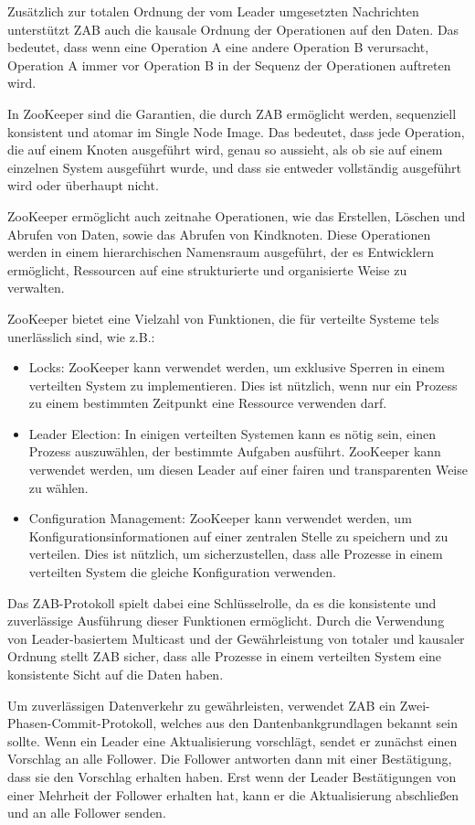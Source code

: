 Zusätzlich zur totalen Ordnung der vom Leader umgesetzten Nachrichten  unterstützt ZAB auch die kausale Ordnung der Operationen auf den Daten. Das bedeutet, dass wenn eine Operation A eine andere Operation B verursacht, Operation A immer vor Operation B in der Sequenz der Operationen auftreten wird.

In ZooKeeper sind die Garantien, die durch ZAB ermöglicht werden, sequenziell konsistent und atomar im Single Node Image. Das bedeutet, dass jede Operation, die auf einem Knoten ausgeführt wird, genau so aussieht, als ob sie auf einem einzelnen System ausgeführt wurde, und dass sie entweder vollständig ausgeführt wird oder überhaupt nicht.

ZooKeeper ermöglicht auch zeitnahe Operationen, wie das Erstellen, Löschen und Abrufen von Daten, sowie das Abrufen von Kindknoten. Diese Operationen werden in einem hierarchischen Namensraum ausgeführt, der es Entwicklern ermöglicht, Ressourcen auf eine strukturierte und organisierte Weise zu verwalten.

ZooKeeper bietet eine Vielzahl von Funktionen, die für verteilte Systeme tels unerlässlich sind, wie z.B.:
\begin{itemize}
\item Locks: ZooKeeper kann verwendet werden, um exklusive Sperren in einem verteilten System zu implementieren. Dies ist nützlich, wenn nur ein Prozess zu einem bestimmten Zeitpunkt eine Ressource verwenden darf.
\item Leader Election: In einigen verteilten Systemen kann es nötig sein, einen Prozess auszuwählen, der bestimmte Aufgaben ausführt. ZooKeeper kann verwendet werden, um diesen Leader auf einer fairen und transparenten Weise zu wählen.
\item Configuration Management: ZooKeeper kann verwendet werden, um Konfigurationsinformationen auf einer zentralen Stelle zu speichern und zu verteilen. Dies ist nützlich, um sicherzustellen, dass alle Prozesse in einem verteilten System die gleiche Konfiguration verwenden.
\end{itemize}

Das ZAB-Protokoll spielt dabei eine Schlüsselrolle, da es die konsistente und zuverlässige Ausführung dieser Funktionen ermöglicht. Durch die Verwendung von Leader-basiertem Multicast und der Gewährleistung von totaler und kausaler Ordnung stellt ZAB sicher, dass alle Prozesse in einem verteilten System eine konsistente Sicht auf die Daten haben.

Um zuverlässigen Datenverkehr zu gewährleisten, verwendet ZAB ein Zwei-Phasen-Commit-Protokoll, welches aus den Dantenbankgrundlagen bekannt sein sollte. Wenn ein Leader eine Aktualisierung vorschlägt, sendet er zunächst einen Vorschlag an alle Follower. Die Follower antworten dann mit einer Bestätigung, dass sie den Vorschlag erhalten haben. Erst wenn der Leader Bestätigungen von einer Mehrheit der Follower erhalten hat, kann er die Aktualisierung abschließen und an alle Follower senden.

